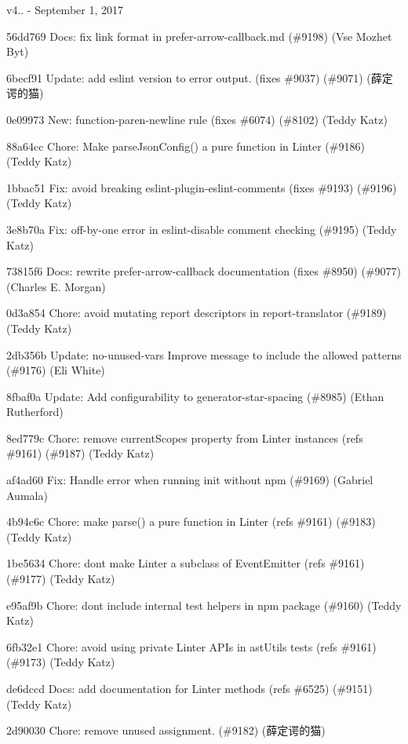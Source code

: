 v4.. -\/ September 1, 2017


\begin{DoxyItemize}
\item 56dd769 Docs\+: fix link format in prefer-\/arrow-\/callback.\+md (\#9198) (Vse Mozhet Byt)
\item 6becf91 Update\+: add eslint version to error output. (fixes \#9037) (\#9071) (薛定谔的猫)
\item 0e09973 New\+: function-\/paren-\/newline rule (fixes \#6074) (\#8102) (Teddy Katz)
\item 88a64cc Chore\+: Make parse\+Json\+Config() a pure function in Linter (\#9186) (Teddy Katz)
\item 1bbac51 Fix\+: avoid breaking eslint-\/plugin-\/eslint-\/comments (fixes \#9193) (\#9196) (Teddy Katz)
\item 3e8b70a Fix\+: off-\/by-\/one error in eslint-\/disable comment checking (\#9195) (Teddy Katz)
\item 73815f6 Docs\+: rewrite prefer-\/arrow-\/callback documentation (fixes \#8950) (\#9077) (Charles E. Morgan)
\item 0d3a854 Chore\+: avoid mutating report descriptors in report-\/translator (\#9189) (Teddy Katz)
\item 2db356b Update\+: no-\/unused-\/vars Improve message to include the allowed patterns (\#9176) (Eli White)
\item 8fbaf0a Update\+: Add configurability to generator-\/star-\/spacing (\#8985) (Ethan Rutherford)
\item 8ed779c Chore\+: remove current\+Scopes property from Linter instances (refs \#9161) (\#9187) (Teddy Katz)
\item af4ad60 Fix\+: Handle error when running init without npm (\#9169) (Gabriel Aumala)
\item 4b94c6c Chore\+: make parse() a pure function in Linter (refs \#9161) (\#9183) (Teddy Katz)
\item 1be5634 Chore\+: don\textquotesingle{}t make Linter a subclass of Event\+Emitter (refs \#9161) (\#9177) (Teddy Katz)
\item e95af9b Chore\+: don\textquotesingle{}t include internal test helpers in npm package (\#9160) (Teddy Katz)
\item 6fb32e1 Chore\+: avoid using private Linter A\+P\+Is in ast\+Utils tests (refs \#9161) (\#9173) (Teddy Katz)
\item de6dccd Docs\+: add documentation for Linter methods (refs \#6525) (\#9151) (Teddy Katz)
\item 2d90030 Chore\+: remove unused assignment. (\#9182) (薛定谔的猫)

\end{DoxyItemize}
